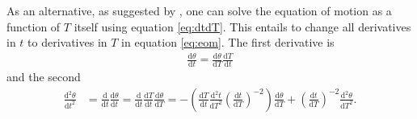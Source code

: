 \documentclass[twoside,a4paper, 12pt]{article}
\newcommand{\diff}{\mathrm{d}}
\numberwithin{equation}{section}
\begin{document}
\noindent
As an alternative, as suggested by \cite[S11]{LatticQCD4Cosmo},  one can
solve the equation of motion as a function of $T$ itself using equation \eqref{eq:dtdT}.
This entails to change all derivatives in $t$ to derivatives in $T$ in equation \eqref{eq:eom}.
The first derivative is
\begin{align*}
    \frac{\diff  \theta}{\diff  t} = \frac{\diff  \theta}{\diff  T} \frac{\diff  T}{\diff  t}
\end{align*}
and the second
\begin{align*}
    \frac{\diff ^2 \theta}{\diff  t^2} &= \frac{\diff }{\diff  t} \frac{\diff  \theta}{\diff  t}
    = \frac{\diff }{\diff  t} \frac{\diff  T}{\diff  t} \frac{\diff  \theta}{\diff  T}
    = - \left(\frac{\diff T}{\diff t} \frac{\diff^2 t}{\diff T^2} \left( \frac{\diff t}{\diff T} \right)^{-2} \right) \frac{\diff  \theta}{\diff  T} +
      \left( \frac{\diff  t}{\diff  T} \right)^{-2} \frac{\diff^2  \theta}{\diff  T^2}.
\end{align*}
\end{document}
